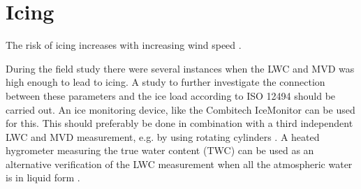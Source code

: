\section{Icing}

The risk of icing increases with increasing wind speed \cite{makk2000}.

During the field study there were several instances when the LWC and MVD was high enough to lead to icing. A study to further investigate the connection between these parameters and the ice load according to ISO 12494 \cite{makk2014} should be carried out. An ice monitoring device, like the Combitech IceMonitor \cite{cost727,thors2015} can be used for this. This should preferably be done in combination with a third independent LWC and MVD measurement, e.g. by using rotating cylinders \cite{makk1992,knez2005}. A heated hygrometer measuring the true water content (TWC) can be used as an alternative verification of the LWC measurement when all the atmospheric water is in liquid form \cite{spie2012}.






